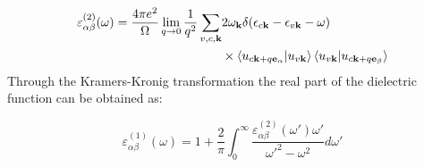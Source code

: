 \documentclass[manuscript=suppinfo,email=true,hyperref=true,keywords=false]{achemso}
\begin{document}
\begin{equation}
\begin{aligned}
  \label{eq:dft-dielectric}
\varepsilon_{\alpha\beta}^{(2)}(\omega)=\frac{4\pi e^2}{\Omega}\lim\limits_{q\rightarrow 0}\frac{1}{q^2}\sum_{v,c,\mathbf{k}}&2\omega_\mathbf{k}\delta(\epsilon_{c\mathbf{k}}-\epsilon_{v\mathbf{k}}-\omega) \\
&\times\braket{u_{c\mathbf{k}+q\mathbf{e}_\alpha}|u_{v\mathbf{k}}}\braket{u_{v\mathbf{k}}|u_{c\mathbf{k}+q\mathbf{e}_\beta}}
\end{aligned}
\end{equation}
Through the Kramers-Kronig transformation the real part of the dielectric function can be obtained as: 

\begin{equation}
  \varepsilon_{\alpha\beta}^{(1)}(\omega)=1+\frac{2}{\pi}\int_0^\infty\frac{\varepsilon_{\alpha\beta}^{(2)}(\omega')\omega'}{\omega'^2-\omega^2}d\omega'
\end{equation}
\end{document}
